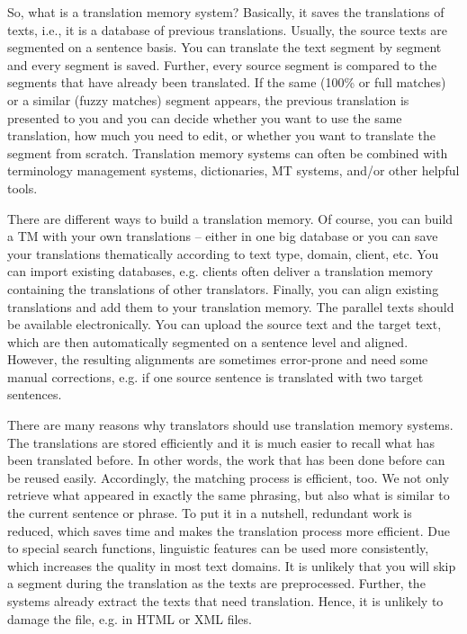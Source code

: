 So, what is a translation memory system? Basically, it saves the translations of texts, i.e., it is a database of previous translations. Usually, the source texts are segmented on a sentence basis. You can translate the text segment by segment and every segment is saved. Further, every source segment is compared to the segments that have already been translated. If the same (100\% or full matches) or a similar (fuzzy matches) segment appears, the previous translation is presented to you and you can decide whether you want to use the same translation, how much you need to edit, or whether you want to translate the segment from scratch. Translation memory systems can often be combined with terminology management systems, dictionaries, MT systems, and/or other helpful tools.

There are different ways to build a translation memory. Of course, you can build a TM with your own translations – either in one big database or you can save your translations thematically according to text type, domain, client, etc. You can import existing databases, e.g. clients often deliver a translation memory containing the translations of other translators. Finally, you can align existing translations and add them to your translation memory. The parallel texts should be available electronically. You can upload the source text and the target text, which are then automatically segmented on a sentence level and aligned. However, the resulting alignments are sometimes error-prone and need some manual corrections, e.g. if one source sentence is translated with two target sentences.

There are many reasons why translators should use translation memory systems. The translations are stored efficiently and it is much easier to recall what has been translated before. In other words, the work that has been done before can be reused easily. Accordingly, the matching process is efficient, too. We not only retrieve what appeared in exactly the same phrasing, but also what is similar to the current sentence or phrase. To put it in a nutshell, redundant work is reduced, which saves time and makes the translation process more efficient. Due to special search functions, linguistic features can be used more consistently, which increases the quality in most text domains. It is unlikely that you will skip a segment during the translation as the texts are preprocessed. Further, the systems already extract the texts that need translation. Hence, it is unlikely to damage the file, e.g. in HTML or XML files. 

